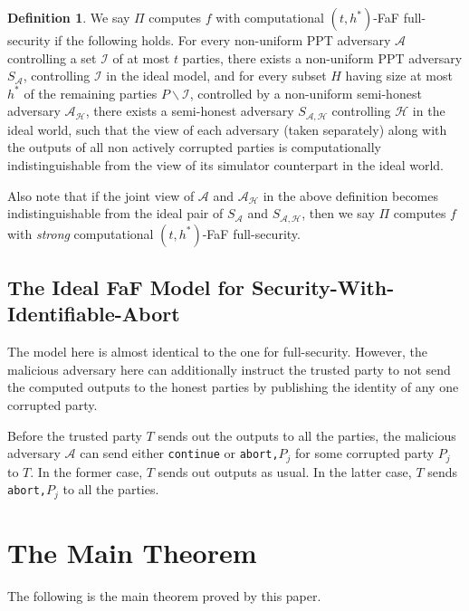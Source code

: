 \documentclass[11pt, a4paper]{article}
\theoremstyle{definition}
\newtheorem{definition}{Definition}[section]
\theoremstyle{remark}
\begin{document}
\begin{definition}
We say $\Pi$ computes $f$ with computational $(t,h^*)$-FaF full-security if the following holds. For every non-uniform PPT adversary $\mathcal{A}$ controlling a set $\mathcal{I}$ of at most $t$ parties, there exists a non-uniform PPT adversary $S_\mathcal{A}$, controlling $\mathcal{I}$ in the ideal model, and for every subset $H$ having size at most $h^*$ of the remaining parties $P\backslash\mathcal{I}$, controlled by a non-uniform semi-honest adversary $\mathcal{A}_{\mathcal{H}}$, there exists a semi-honest adversary $S_{\mathcal{A},\mathcal{H}}$ controlling $\mathcal{H}$ in the ideal world, such that the view of each adversary (taken separately) along with the outputs of all non actively corrupted parties is computationally indistinguishable from the view of its simulator counterpart in the ideal world.
\end{definition}

Also note that if the joint view of $\mathcal{A}$ and $\mathcal{A}_\mathcal{H}$ in the above definition becomes indistinguishable from the ideal pair of $S_\mathcal{A}$ and $S_{\mathcal{A},\mathcal{H}}$, then we say $\Pi$ computes $f$ with \textit{strong} computational $(t,h^*)$-FaF full-security.

\subsection{The Ideal FaF Model for Security-With-Identifiable-Abort}

The model here is almost identical to the one for full-security. However, the malicious adversary here can additionally instruct the trusted party to not send the computed outputs to the honest parties by publishing the identity of any one corrupted party.

\medskip

Before the trusted party $T$ sends out the outputs to all the parties, the malicious adversary $\mathcal{A}$ can send either \texttt{continue} or \texttt{abort,}$P_j$ for some corrupted party $P_j$ to $T$. In the former case, $T$ sends out outputs as usual. In the latter case, $T$ sends \texttt{abort,}$P_j$ to all the parties.

\section{The Main Theorem}

The following is the main theorem proved by this paper.
\end{document}
